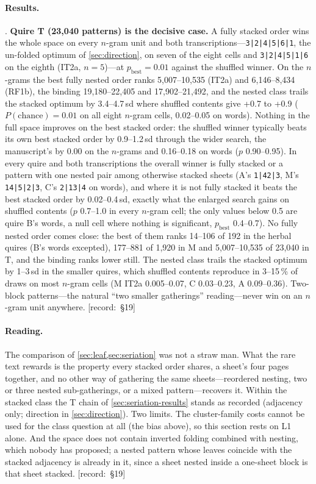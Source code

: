 \documentclass[11pt,a4paper]{article}
\newcommand{\src}[1]{{\footnotesize\color{muted}\sffamily\mbox{[record: \S#1]}}}
\newcommand{\IT}{\textcolor{it2a}{IT2a}}
\newcommand{\RF}{\textcolor{rf1b}{RF1b}}
\newcommand{\order}[1]{\texttt{#1}}
\begin{document}
\paragraph{Results.} . \textbf{Quire T (23,040 patterns) is the decisive case.} A fully stacked order wins the whole space on every $n$-gram unit and both transcriptions---\order{3|2|4|5|6|1}, the un-folded optimum of \cref{sec:direction}, on seven of the eight cells and \order{3|2|4|5|1|6} on the eighth (\IT, $n=5$)---at $p_{\text{best}}=0.01$ against the shuffled winner. On the $n$-grams the best fully nested order ranks 5,007--10,535 (\IT) and 6,146--8,434 (\RF), the binding 19,180--22,405 and 17,902--21,492, and the nested class trails the stacked optimum by 3.4--4.7\,sd where shuffled contents give +0.7 to +0.9 ($P(\text{chance})=0.01$ on all eight $n$-gram cells, 0.02--0.05 on words). Nothing in the full space improves on the best stacked order: the shuffled winner typically beats its own best stacked order by 0.9--1.2\,sd through the wider search, the manuscript's by 0.00 on the $n$-grams and 0.16--0.18 on words ($p$ 0.90--0.95). In every quire and both transcriptions the overall winner is fully stacked or a pattern with one nested pair among otherwise stacked sheets (A's \order{1|42|3}, M's \order{14|5|2|3}, C's \order{2|13|4} on words), and where it is not fully stacked it beats the best stacked order by 0.02--0.4\,sd, exactly what the enlarged search gains on shuffled contents ($p$ 0.7--1.0 in every $n$-gram cell; the only values below 0.5 are quire B's words, a null cell where nothing is significant, $p_{\text{best}}$ 0.4--0.7). No fully nested order comes close: the best of them ranks 14--106 of 192 in the herbal quires (B's words excepted), 177--881 of 1,920 in M and 5,007--10,535 of 23,040 in T, and the binding ranks lower still. The nested class trails the stacked optimum by 1--3\,sd in the smaller quires, which shuffled contents reproduce in 3--15\,\% of draws on most $n$-gram cells (M \IT{} 0.005--0.07, C 0.03--0.23, A 0.09--0.36). Two-block patterns---the natural ``two smaller gatherings'' reading---never win on an $n$-gram unit anywhere. \src{19}

\paragraph{Reading.} The comparison of \cref{sec:leaf,sec:seriation} was not a straw man. What the rare text rewards is the property every stacked order shares, a sheet's four pages together, and no other way of gathering the same sheets---reordered nesting, two or three nested sub-gatherings, or a mixed pattern---recovers it. Within the stacked class the T chain of \cref{sec:seriation-results} stands as recorded (adjacency only; direction in \cref{sec:direction}). Two limits. The cluster-family costs cannot be used for the class question at all (the bias above), so this section rests on L1 alone. And the space does not contain inverted folding combined with nesting, which nobody has proposed; a nested pattern whose leaves coincide with the stacked adjacency is already in it, since a sheet nested inside a one-sheet block is that sheet stacked. \src{19}
\end{document}
